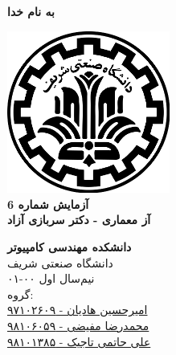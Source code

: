 \documentclass{article}
\begin{document}
\begin{titlepage}
	\begin{center}
		\textbf{ \Huge{به نام خدا}}
	
		\vspace{0.2cm}
		
		\includegraphics[width=0.4\textwidth]{sharif.png}\\
		\vspace{0.2cm}
		\textbf{ \Huge{آزمایش شماره 6}}\\
		\vspace{0.25cm}
		\textbf{ \Large{آز معماری - دکتر سربازی آزاد}}
		\vspace{0.2cm}
		
		
		\large \textbf{دانشکده مهندسی کامپیوتر}\\\vspace{0.1cm}
		\large   دانشگاه صنعتی شریف\\\vspace{0.2cm}
		\large   ﻧﯿﻢ‌سال اول ۰۰-۰۱ \\\vspace{0.10cm}
		\large{گروه:}\\
		\large{\href{mailto:a.h.hadian@gmail.com}{امیرحسین هادیان - ۹۷۱۰۲۶۰۹}}\\
		\large{\href{mailto:mofayezi.m@gmail.com}{محمدرضا مفیضی - ۹۸۱۰۶۰۵۹}}\\
		\large{\href{mailto:a.hatam008@gmail.com}{علی حاتمی تاجیک - ۹۸۱۰۱۳۸۵}}\\
	\end{center}
\end{titlepage}

\newpage

\pagestyle{fancy}
\fancyhf{}
\fancyfoot{}
\setlength{\headheight}{59pt}
\cfoot{\thepage}
\end{document}
